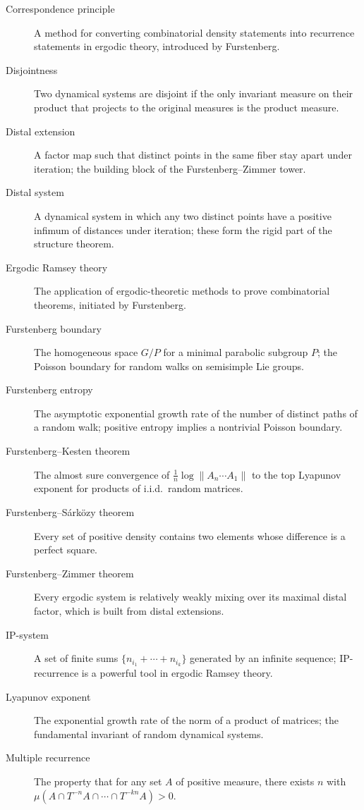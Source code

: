 \begin{description}
    \item[Correspondence principle] A method for converting combinatorial density statements into recurrence statements in ergodic theory, introduced by Furstenberg.
    \item[Disjointness] Two dynamical systems are disjoint if the only invariant measure on their product that projects to the original measures is the product measure.
    \item[Distal extension] A factor map such that distinct points in the same fiber stay apart under iteration; the building block of the Furstenberg--Zimmer tower.
    \item[Distal system] A dynamical system in which any two distinct points have a positive infimum of distances under iteration; these form the rigid part of the structure theorem.
    \item[Ergodic Ramsey theory] The application of ergodic-theoretic methods to prove combinatorial theorems, initiated by Furstenberg.
    \item[Furstenberg boundary] The homogeneous space \(G/P\) for a minimal parabolic subgroup \(P\); the Poisson boundary for random walks on semisimple Lie groups.
    \item[Furstenberg entropy] The asymptotic exponential growth rate of the number of distinct paths of a random walk; positive entropy implies a nontrivial Poisson boundary.
    \item[Furstenberg--Kesten theorem] The almost sure convergence of \(\frac{1}{n}\log\|A_n\cdots A_1\|\) to the top Lyapunov exponent for products of i.i.d.\ random matrices.
    \item[Furstenberg--S\'ark\"ozy theorem] Every set of positive density contains two elements whose difference is a perfect square.
    \item[Furstenberg--Zimmer theorem] Every ergodic system is relatively weakly mixing over its maximal distal factor, which is built from distal extensions.
    \item[IP-system] A set of finite sums \(\{n_{i_1}+\cdots+n_{i_k}\}\) generated by an infinite sequence; IP-recurrence is a powerful tool in ergodic Ramsey theory.
    \item[Lyapunov exponent] The exponential growth rate of the norm of a product of matrices; the fundamental invariant of random dynamical systems.
    \item[Multiple recurrence] The property that for any set \(A\) of positive measure, there exists \(n\) with \(\mu(A \cap T^{-n}A \cap \cdots \cap T^{-kn}A) > 0\).

\end{description}
